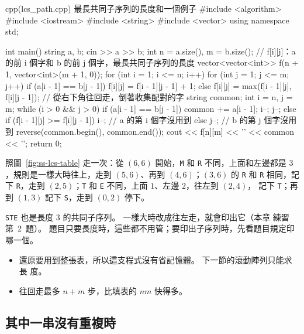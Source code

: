 \begin{example}[label=ex:ss-lcs-path]{cpp}{(lcs\_path.cpp) 最長共同子序列的長度和一個例子}
#include <algorithm>
#include <iostream>
#include <string>
#include <vector>
using namespace std;

int main() {
    string a, b;
    cin >> a >> b;
    int n = a.size(), m = b.size();
    // f[i][j]：a 的前 i 個字和 b 的前 j 個字，最長共同子序列的長度
    vector<vector<int>> f(n + 1, vector<int>(m + 1, 0));
    for (int i = 1; i <= n; i++) {
        for (int j = 1; j <= m; j++) {
            if (a[i - 1] == b[j - 1]) {
                f[i][j] = f[i - 1][j - 1] + 1;
            } else {
                f[i][j] = max(f[i - 1][j], f[i][j - 1]);
            }
        }
    }
    // 從右下角往回走，倒著收集配對的字
    string common;
    int i = n, j = m;
    while (i > 0 && j > 0) {
        if (a[i - 1] == b[j - 1]) {
            common += a[i - 1];
            i--;
            j--;
        } else if (f[i - 1][j] >= f[i][j - 1]) {
            i--;                        // a 的第 i 個字沒用到
        } else {
            j--;                        // b 的第 j 個字沒用到
        }
    }
    reverse(common.begin(), common.end());
    cout << f[n][m] << '\n' << common << '\n';
    return 0;
}
\end{example}


照圖~\ref{fig:ss-lcs-table} 走一次：從 $(6, 6)$ 開始，\texttt{M} 和
\texttt{R} 不同，上面和左邊都是 $3$，規則是一樣大時往上，走到 $(5, 6)$、再到
$(4, 6)$；$(3, 6)$ 的 \texttt{R} 和 \texttt{R} 相同，記下 \texttt{R}，走到
$(2, 5)$；\texttt{T} 和 \texttt{E} 不同，上面 $1$、左邊 $2$，往左到 $(2, 4)$，
記下 \texttt{T}；再到 $(1, 3)$ 記下 \texttt{S}，走到 $(0, 2)$ 停下。

\texttt{STE} 也是長度 $3$ 的共同子序列。 一樣大時改成往左走，就會印出它（本章
練習第~2~題）。 題目只要長度時，這些都不用管；要印出子序列時，先看題目規定印
哪一個。

\begin{itemize}
\item 還原要用到整張表，所以這支程式沒有省記憶體。 下一節的滾動陣列只能求長
度。
\item 往回走最多 $n + m$ 步，比填表的 $nm$ 快得多。
\end{itemize}

\subsection{其中一串沒有重複時}
\label{sec:ss-lcs-lis}

